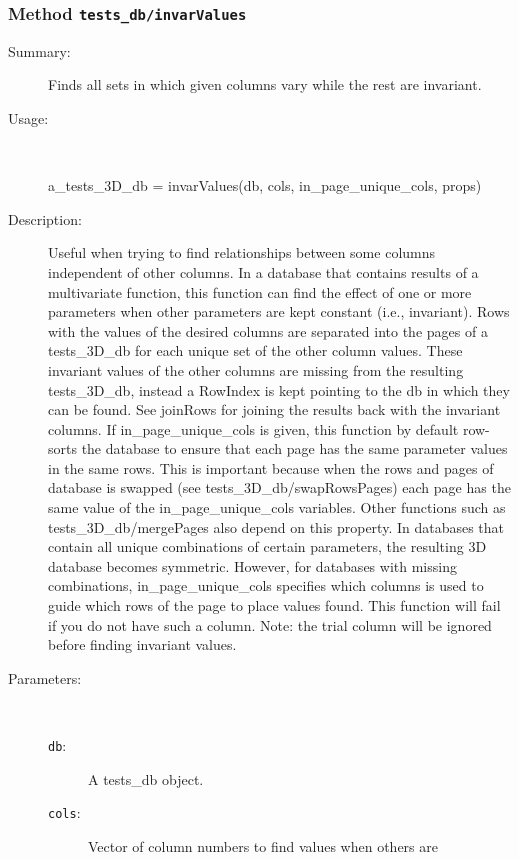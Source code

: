 \subsubsection[Method \texttt{invarValues}]{Method \texttt{tests\_db/invarValues}}%
%
\label{ref_tests_db__invarValues}%
\hypertarget{ref_tests_db__invarValues}{}%
\begin{description}
\item[Summary:]Finds all sets in which given columns vary while the rest are invariant.
%
\item[Usage:]~%
\begin{lyxcode}%
a\_tests\_3D\_db = invarValues(db, cols, in\_page\_unique\_cols, props)
%
\end{lyxcode}%
%
\item[Description:]%
Useful when trying to find relationships between some columns
 independent of other columns. In a database that contains results of a
 multivariate function, this function can find the effect of one or more
 parameters when other parameters are kept constant (i.e., invariant). Rows
 with the values of the desired columns are separated into the pages of a
 tests\_3D\_db for each unique set of the other column values. These
 invariant values of the other columns are missing from the resulting
 tests\_3D\_db, instead a RowIndex is kept pointing to the db in which they
 can be found. See joinRows for joining the results back with the invariant
 columns.
   If in\_page\_unique\_cols is given, this function by default row-sorts the
 database to ensure that each page has the same parameter values in the
 same rows. This is important because when the rows and pages of database
 is swapped (see tests\_3D\_db/swapRowsPages) each page has the same value of
 the in\_page\_unique\_cols variables. Other functions such as
 tests\_3D\_db/mergePages also depend on this property.
   In databases that contain all unique combinations of certain parameters,
 the resulting 3D database becomes symmetric. However, for databases with
 missing combinations, in\_page\_unique\_cols specifies which columns is used
 to guide which rows of the page to place values found. This function will
 fail if you do not have such a column.  Note: the trial column will be
 ignored before finding invariant values.
\item[Parameters:]~
\begin{description}%
\item[\texttt{db}:]
 A tests\_db object.
\item[\texttt{cols}:]
 Vector of column numbers to find values when others are


\end{description}
\end{description}
